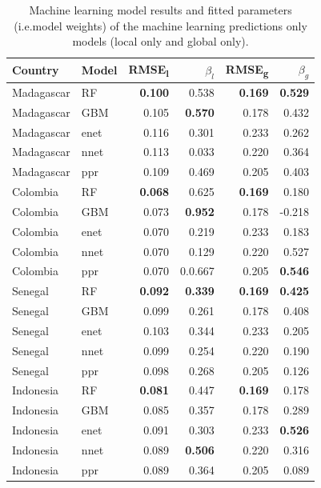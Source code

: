 \documentclass[review]{elsarticle}
\begin{document}
\begin{table}
\caption{Machine learning model results and fitted parameters (i.e.\thinspace model weights) of the machine learning predictions only models (local only and global only). }
\centering
\small
\begin{tabular}{ll|rr|rr}
     Country          & Model &      RMSE\textsubscript{l} & $\beta_l$ & RMSE\textsubscript{g} & $\beta_g$ \\ \hline
Madagascar & RF & \textbf{0.100} & 0.538 &  \textbf{0.169} & \textbf{0.529}\\
Madagascar & GBM & 0.105 & \textbf{0.570} & 0.178& 0.432 \\
Madagascar & enet & 0.116 & 0.301 &0.233 & 0.262 \\
Madagascar & nnet & 0.113 & 0.033 &0.220 & 0.364 \\
Madagascar & ppr & 0.109 & 0.469 & 0.205 &  0.403\vspace{0.3cm}\\ 
Colombia & RF & \textbf{0.068} & 0.625 &  \textbf{0.169} & 0.180\\
Colombia & GBM & 0.073 & \textbf{0.952} & 0.178& -0.218  \\
Colombia & enet & 0.070 & 0.219 &0.233 & 0.183 \\
Colombia & nnet & 0.070 & 0.129 &0.220 & 0.527 \\
Colombia & ppr & 0.070 & 0.0.667 & 0.205 &  \textbf{0.546}\vspace{0.3cm}\\
Senegal & RF & \textbf{0.092} & \textbf{0.339} & \textbf{0.169} & \textbf{0.425} \\
Senegal & GBM & 0.099 & 0.261& 0.178& 0.408 \\
Senegal & enet& 0.103 & 0.344  &0.233 & 0.205 \\
Senegal & nnet & 0.099 & 0.254 &0.220 & 0.190 \\
Senegal & ppr & 0.098 & 0.268& 0.205 &  0.126\vspace{0.3cm}\\
Indonesia & RF& \textbf{0.081} & 0.447 & \textbf{0.169} & 0.178\\
Indonesia & GBM & 0.085 & 0.357 & 0.178& 0.289 \\
Indonesia & enet & 0.091 & 0.303 &0.233 & \textbf{0.526} \\
Indonesia & nnet & 0.089 & \textbf{0.506} &0.220 & 0.316 \\
Indonesia & ppr & 0.089 & 0.364 & 0.205 &  0.089\vspace{0.3cm}\\

\end{tabular}
\label{t:mlresults}
\end{table}
\end{document}
